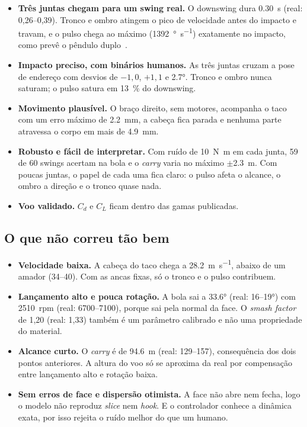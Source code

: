 \documentclass[11pt,a4paper]{article}
\begin{document}
\begin{itemize}[itemsep=3pt]
  \item \textbf{Três juntas chegam para um swing real.} O downswing dura
        \SI{0.30}{\second} (real: 0,26--0,39). Tronco e ombro atingem o pico
        de velocidade antes do impacto e travam, e o pulso chega ao máximo
        (\SI{1392}{\degree\per\second}) exatamente no impacto, como prevê o
        pêndulo duplo~\cite{jorgensen1970,pickering1999}.
  \item \textbf{Impacto preciso, com binários humanos.} As três juntas cruzam
        a pose de endereço com desvios de $-1{,}0$, $+1{,}1$ e \ang{+2.7}.
        Tronco e ombro nunca saturam; o pulso satura em \SI{13}{\percent} do
        downswing.
  \item \textbf{Movimento plausível.} O braço direito, sem motores, acompanha
        o taco com um erro máximo de \SI{2.2}{\milli\meter}, a cabeça fica
        parada e nenhuma parte atravessa o corpo em mais de
        \SI{4.9}{\milli\meter}.
  \item \textbf{Robusto e fácil de interpretar.} Com ruído de
        \SI{10}{\newton\meter} em cada junta, 59 de 60 swings acertam na bola
        e o \emph{carry} varia no máximo $\pm$\SI{2.3}{\meter}. Com poucas
        juntas, o papel de cada uma fica claro: o pulso afeta o alcance, o
        ombro a direção e o tronco quase nada.
  \item \textbf{Voo validado.} $C_d$ e $C_L$ ficam dentro das gamas
        publicadas.
\end{itemize}

\subsection*{\textcolor{mau}{O que não correu tão bem}}

\begin{itemize}[itemsep=3pt]
  \item \textbf{Velocidade baixa.} A cabeça do taco chega a
        \SI{28.2}{\meter\per\second}, abaixo de um amador (34--40). Com as
        ancas fixas, só o tronco e o pulso contribuem.
  \item \textbf{Lançamento alto e pouca rotação.} A bola sai a \ang{33.6}
        (real: 16--\ang{19}) com \SI{2510}{rpm} (real: 6700--7100), porque
        sai pela normal da face. O \emph{smash factor} de 1,20 (real: 1,33)
        também é um parâmetro calibrado e não uma propriedade do material.
  \item \textbf{Alcance curto.} O \emph{carry} é de \SI{94.6}{\meter} (real:
        129--157), consequência dos dois pontos anteriores. A altura do voo só
        se aproxima da real por compensação entre lançamento alto e rotação
        baixa.
  \item \textbf{Sem erros de face e dispersão otimista.} A face não abre nem
        fecha, logo o modelo não reproduz \emph{slice} nem \emph{hook}. E o
        controlador conhece a dinâmica exata, por isso rejeita o ruído melhor
        do que um humano.
\end{itemize}
\end{document}

